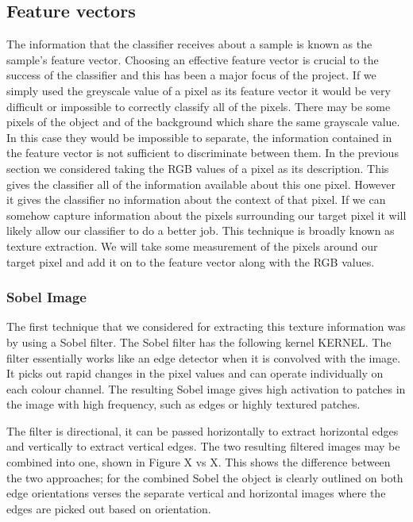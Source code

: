 \documentclass[12pt]{IIBproject}
\begin{document}
\subsection{Feature vectors}
The information that the classifier receives about a sample is known as the sample's feature vector.  Choosing an effective feature vector is crucial to the success of the classifier and this has been a major focus of the project. If we simply used the greyscale value of a pixel as its feature vector it would be very difficult or impossible to correctly classify all of the pixels. There may be some pixels of the object and of the background which share the same grayscale value. In this case they would be impossible to separate, the information contained in the feature vector is not sufficient to discriminate between them. In the previous section we considered taking the RGB values of a pixel as its description. This gives the classifier all of the information available about this one pixel. However it gives the classifier no information about the context of that pixel. If we can somehow capture information about the pixels surrounding our target pixel it will likely allow our classifier to do a better job. This technique is broadly known as texture extraction. We will take some measurement of the pixels around our target pixel and add it on to the feature vector along with the RGB values.

\subsubsection{Sobel Image}

 The first technique that we considered for extracting this texture information was by using a Sobel filter. The Sobel filter has the following kernel KERNEL. The filter essentially works like an edge detector when it is convolved with the image. It picks out rapid changes in the pixel values and can operate individually on each colour channel. The resulting Sobel image gives high activation to patches in the image with high frequency, such as edges or highly textured patches.
 
 The filter is directional, it can be passed horizontally to extract horizontal edges and vertically to extract vertical edges. The two resulting filtered images may be combined into one, shown in Figure X vs X. This shows the difference between the two approaches;  for the combined Sobel the object is clearly outlined on both edge orientations verses the separate vertical and horizontal images where the edges are picked out based on orientation. 
\end{document}
